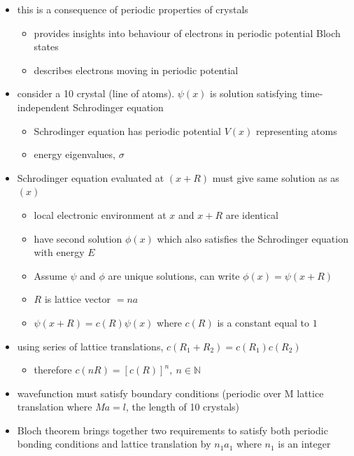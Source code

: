 \documentclass[a4paper,11pt,normalem]{article}
\begin{document}
\begin{itemize}
    \item this is a consequence of periodic properties of crystals
        \begin{itemize}
            \item provides insights into behaviour of electrons in periodic potential Bloch states
            \item describes electrons moving in periodic potential
        \end{itemize}
    \item consider a 10 crystal (line of atoms). \(\psi(x)\) is solution satisfying time-independent Schrodinger equation
        \begin{itemize}
            \item Schrodinger equation has periodic potential \(V(x)\) representing atoms
            \item energy eigenvalues, \(\sigma\)
        \end{itemize}
    \item Schrodinger equation evaluated at \((x+R)\) must give same solution as as \((x)\)
        \begin{itemize}
            \item local electronic environment at \(x\) and \(x+R\) are identical
            \item have second solution \(\phi(x)\) which also satisfies the Schrodinger equation with energy \(E\)
            \item Assume \(\psi\) and \(\phi\) are unique solutions, can write \(\phi(x) = \psi(x+R)\)
            \item \(R\) is lattice vector \(=na\)
            \item \(\psi(x+R) = c(R)\psi(x)\) where \(c(R)\) is a constant equal to \(1\)
        \end{itemize}
    \item using series of lattice translations, \(c(R_1+R_2) = c(R_1)c(R_2)\)
        \begin{itemize}
            \item therefore \(c(nR) = [c(R)]^n,~ n \in \mathbb{N}\)
        \end{itemize}
    \item wavefunction must satisfy boundary conditions (periodic over M lattice translation where \(Ma = l\), the length of 10 crystals)
    \item Bloch theorem brings together two requirements to satisfy both periodic bonding conditions and lattice translation by \(n_1a_1\) where \(n_1\) is an integer

\end{itemize}
\end{document}
